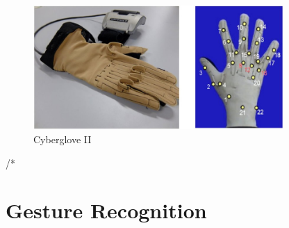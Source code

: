 \begin{figure}[h]
	\centering
		\includegraphics[width=0.85\textwidth]{images/cyberglove.png}
		\caption{Cyberglove II}
		\label{fig:glove}
\end{figure}
















\iffalse
/*\section{Gesture Recognition}

